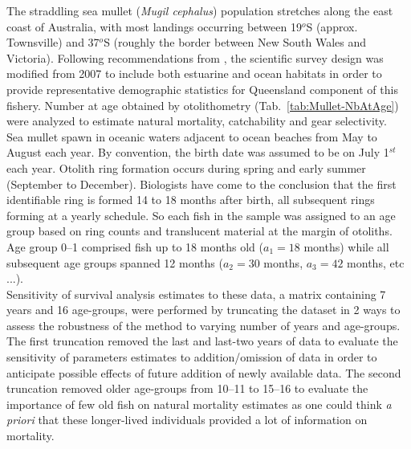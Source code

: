 The straddling sea mullet ({\it Mugil cephalus}) population stretches along the east coast of Australia, with most landings occurring between 19$^{o}$S (approx. Townsville) and 37$^{o}$S (roughly the border between New South Wales and Victoria). Following recommendations from \cite{Bell2005r}, the scientific survey design was modified from 2007 to include both estuarine and ocean habitats in order to provide representative demographic statistics for Queensland component of this fishery. Number at age obtained by otolithometry (Tab.~\ref{tab:Mullet-NbAtAge}) were analyzed to estimate natural mortality, catchability and gear selectivity. \\

Sea mullet spawn in oceanic waters adjacent to ocean beaches from May to August each year. By convention, the birth date was assumed to be on July 1$^{st}$ each year. Otolith ring formation occurs during spring and early summer (September to December). Biologists have come to the conclusion that the first identifiable ring is formed 14 to 18 months after birth, all subsequent rings forming at a yearly schedule. So each fish in the sample was assigned to an age group based on ring counts and translucent material at the margin of otoliths. Age group 0--1 comprised fish up to 18 months old ($a_{1}=18$ months) while all subsequent age groups spanned 12 months ($a_{2} = 30$ months, $a_{3}= 42$ months, etc ...).\\

Sensitivity of survival analysis estimates to these data, a matrix containing 7 years and 16 age-groups, were performed by truncating the dataset in 2 ways to assess the robustness of the method to varying number of years and age-groups. The first truncation removed the last and last-two years of data to evaluate the sensitivity of parameters estimates to addition/omission of data in order to anticipate possible effects of future addition of newly available data. The second truncation removed older age-groups from 10--11 to 15--16 to evaluate the importance of few old fish on natural mortality estimates as one could think {\it a priori} that these longer-lived individuals provided a lot of information on mortality.\\


